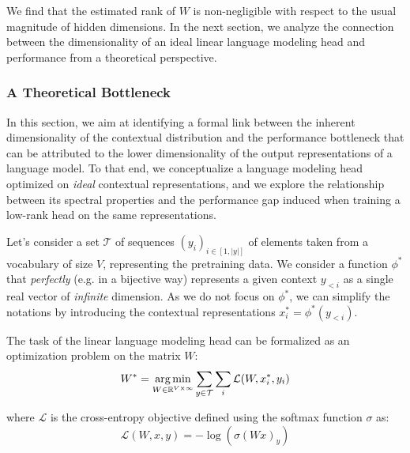 We find that the estimated rank of $W$ is non-negligible with respect to the usual magnitude of hidden dimensions. In the next section, we analyze the connection between the dimensionality of an ideal linear language modeling head and performance from a theoretical perspective.


\subsubsection{A Theoretical Bottleneck}
In this section, we aim at identifying a formal link between the inherent dimensionality of the contextual distribution and the performance bottleneck that can be attributed to the lower dimensionality of the output representations of a language model. To that end, we conceptualize a language modeling head optimized on \textit{ideal} contextual representations, and we explore the relationship between its spectral properties and the performance gap induced when training a low-rank head on the same representations.  


Let's consider a set $\mathcal{T}$ of sequences $(y_i)_{i \in [1, |y|]}$ of elements taken from a vocabulary of size $V$, representing the pretraining data. We consider a function $\phi^*$ that \textit{perfectly} (e.g. in a bijective way) represents a given context $y_{< i}$ as a single real vector of \textit{infinite} dimension. As we do not focus on $\phi^*$, we can simplify the notations by introducing the contextual representations $x^*_i = \phi^*(y_{< i})$. 

The task of the linear language modeling head can be formalized as an optimization problem on the matrix $W$:
\begin{equation}
W^* = \operatorname*{arg\,min}_{W \in \mathbb{R}^{V \times \infty}} \sum_{y \in \mathcal{T}} \sum_{i} \mathcal{L}(W, x^*_i, y_i)
\label{eq:unconstrained}
\end{equation}

where $\mathcal{L}$ is the cross-entropy objective defined using the softmax function $\sigma$ as:
$$
\mathcal{L}(W, x, y) = - \log (\sigma(Wx)_{y})
$$

